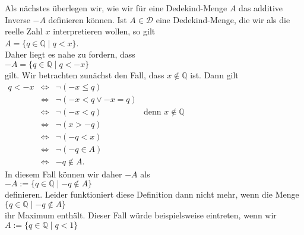 Als nächstes überlegen wir, wie wir für eine Dedekind-Menge $A$ das additive Inverse $-\!A$ 
definieren können.  Ist $A \in \mathcal{D}$ eine Dedekind-Menge, die wir als die reelle Zahl $x$
interpretieren wollen, so gilt
\\[0.2cm]
\hspace*{1.3cm}
$A = \{ q \in \mathbb{Q} \mid q < x \}$.
\\[0.2cm]
Daher liegt es nahe zu fordern, dass 
\\[0.2cm]
\hspace*{1.3cm}
$-A = \{ q \in \mathbb{Q} \mid q < -x \}$
\\[0.2cm]
gilt.  Wir betrachten zunächst den Fall, dass $x \not\in \mathbb{Q}$ ist.
Dann gilt
\\[0.2cm]
\hspace*{1.3cm}
$
\begin{array}{lcll}
q < -x & \Leftrightarrow & \neg (-x \leq q)                                              \\
       & \Leftrightarrow & \neg (-x < q \vee -x = q)                                     \\
       & \Leftrightarrow & \neg (-x < q)             & \mbox{denn $x \not\in\mathbb{Q}$} \\
       & \Leftrightarrow & \neg (x > -q)                                                 \\
       & \Leftrightarrow & \neg (-q < x)                                                 \\
       & \Leftrightarrow & \neg (-q \in A)                                               \\
       & \Leftrightarrow & -q \not\in A.
\end{array}
$
\\[0.2cm]
In diesem Fall können wir daher $-A$ als
\\[0.2cm]
\hspace*{1.3cm}
$-A := \{ q \in \mathbb{Q} \mid -q \not\in A \}$
\\[0.2cm]
definieren.  Leider funktioniert diese Definition dann nicht mehr, wenn die Menge 
\\[0.2cm]
\hspace*{1.3cm}
$\{ q \in \mathbb{Q} \mid -q \not\in A \}$
\\[0.2cm]
ihr Maximum enthält.  Dieser Fall würde beispielsweise eintreten, wenn wir
\\[0.2cm]
\hspace*{1.3cm}
$A := \{ q \in \mathbb{Q} \mid q < 1 \}$
\\[0.2cm]  

